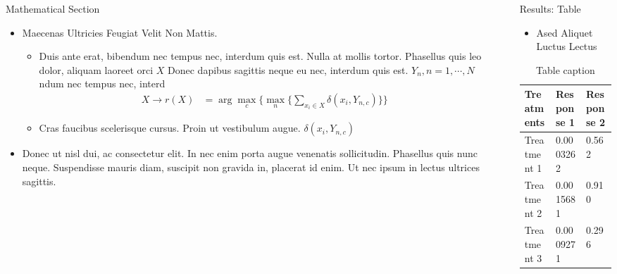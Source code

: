 \documentclass[final,hyperref={pdfpagelabels=false}]{beamer}
\begin{document}
\begin{frame}[t]
\begin{columns}[t]
\begin{column}{.465\textwidth}
\begin{otblock}{Mathematical Section}
\begin{itemize}
\item Maecenas Ultricies Feugiat Velit Non Mattis.
\begin{itemize}
\item Duis ante erat, bibendum nec tempus nec, interdum quis est. Nulla at mollis tortor. Phasellus quis leo dolor, aliquam laoreet orci $X$ Donec dapibus sagittis neque eu nec, interdum quis est. $Y_n, n=1,\cdots,N$ ndum nec tempus nec, interd
\begin{align*}
X \rightarrow r(X) & = \arg \max_{c} \Big\{ \max_n \big\{ \sum_{x_i \in X} \delta(x_i,Y_{n,c})\big\} \Big\}
\end{align*}
\item Cras faucibus scelerisque cursus. Proin ut vestibulum augue. $\delta(x_i,Y_{n,c})$
\end{itemize}
\item Donec ut nisl dui, ac consectetur elit. In nec enim porta augue venenatis sollicitudin. Phasellus quis nunc neque. Suspendisse mauris diam, suscipit non gravida in, placerat id enim. Ut nec ipsum in lectus ultrices sagittis.
\end{itemize}

\end{otblock}


\end{column} %

\begin{column}{.01\textwidth}\end{column} %

\begin{column}{.465\textwidth} %


\begin{ctblock}{Results: Table}

\begin{itemize}
\item Ased Aliquet Luctus Lectus
\end{itemize}

\begin{table}
\begin{tabular}{l l l}
\toprule
\textbf{Treatments} & \textbf{Response 1} & \textbf{Response 2}\\
\midrule
Treatment 1 & 0.0003262 & 0.562 \\
Treatment 2 & 0.0015681 & 0.910 \\
Treatment 3 & 0.0009271 & 0.296 \\
\bottomrule
\end{tabular}
\caption{Table caption}
\end{table}


\end{ctblock}
\end{column}
\end{columns}
\end{frame}
\end{document}
